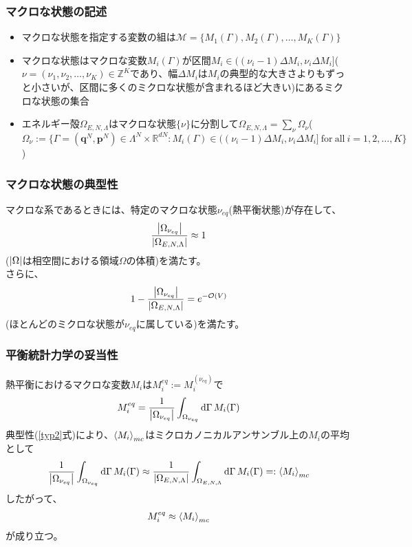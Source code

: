 \documentclass{ltjsarticle}
\begin{document}
  \subsubsection{マクロな状態の記述}
  \begin{itemize}
    \item マクロな状態を指定する変数の組は$\mathcal{M}=\{M_1(\Gamma),M_2(\Gamma),\dots,M_K(\Gamma)\}$
    \item マクロな状態はマクロな変数$M_i(\Gamma)$が区間$M_i\in((\nu_i-1)\Delta M_i,\nu_i\Delta M_i]$($\nu=(\nu_1,\nu_2,\dots,\nu_K)\in\mathbb{Z}^K$であり、幅$\Delta M_i$は$M_i$の典型的な大きさよりもずっと小さいが、区間に多くのミクロな状態が含まれるほど大きい)にあるミクロな状態の集合
    \item エネルギー殻$\Omega_{E,N,\Lambda}$はマクロな状態$\{\nu\}$に分割して$\Omega_{E,N,\Lambda}=\sum_{\nu}\Omega_{\nu}$($\Omega_{\nu}:=\{\Gamma=(\bm{q}^N,\bm{p}^N)\in\Lambda^N\times\mathbb{R}^{dN}:M_i(\Gamma)\in((\nu_i-1)\Delta M_i,\nu_i\Delta M_i]\ \textrm{for}\ \textrm{all}\ i=1,2,\dots,K\}$)
  \end{itemize}
  \subsubsection{マクロな状態の典型性}
  マクロな系であるときには、特定のマクロな状態$\nu_{eq}$(熱平衡状態)が存在して、
  \begin{align}
    \frac{\abs{\Omega_{\nu_{eq}}}}{\abs{\Omega_{E,N,\Lambda}}}\approx 1
  \end{align}
  ($\abs{\Omega}$は相空間における領域$\Omega$の体積)を満たす。\\
  さらに、
  \begin{align}
    1-\frac{\abs{\Omega_{\nu_{eq}}}}{\abs{\Omega_{E,N,\Lambda}}}=e^{-\order{V}}
    \label{typ2}
  \end{align}
  (ほとんどのミクロな状態が$\nu_{eq}$に属している)を満たす。\\
  \subsubsection{平衡統計力学の妥当性}
  熱平衡におけるマクロな変数$M_i$は$M_i^{eq}:=M_i^{(\nu_{eq})}$で
  \begin{align}
    M_i^{eq}=\frac{1}{\abs{\Omega_{\nu_{eq}}}}\int_{\Omega_{\nu_{eq}}}\dd{\Gamma} M_i(\Gamma)
    \label{eq:MC}
  \end{align}
  典型性(\eqref{typ2}式)により、$\ev{M_i}_{mc}$はミクロカノニカルアンサンブル上の$M_i$の平均として
  \begin{align}
    \frac{1}{\abs{\Omega_{\nu_{eq}}}}\int_{\Omega_{\nu_{eq}}}\dd{\Gamma} M_i(\Gamma)\approx \frac{1}{\abs{\Omega_{E,N,\Lambda}}}\int_{\Omega_{E,N,\Lambda}} \dd{\Gamma} M_i(\Gamma)=:\ev{M_i}_{mc}
  \end{align}
  したがって、
  \begin{align}
    M_i^{eq}\approx\ev{M_i}_{mc}
  \end{align}
  が成り立つ。
\end{document}
